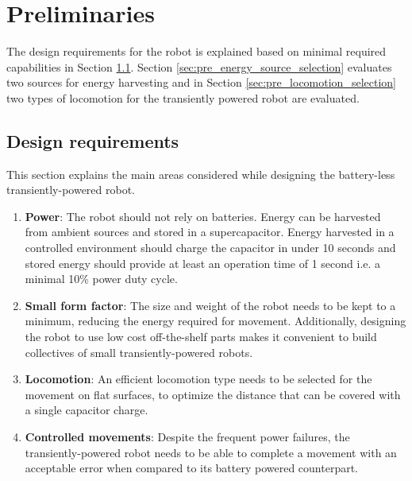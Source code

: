 \chapter{Preliminaries}
\label{chp:preliminaries}

The design requirements for the robot is explained based on minimal required capabilities in Section \ref{sec:pre_design_requirements}.
Section \ref{sec:pre_energy_source_selection} evaluates two sources for energy harvesting and in Section \ref{sec:pre_locomotion_selection} two types of locomotion for the transiently powered robot are evaluated.

\section{Design requirements}
\label{sec:pre_design_requirements}

This section explains the main areas considered while designing the battery-less transiently-powered robot.

\begin{enumerate}
	\item \textbf{Power}: 
	The robot should not rely on batteries.
	Energy can be harvested from ambient sources and stored in a supercapacitor. 
	Energy harvested in a controlled environment should charge the capacitor in under 10 seconds and stored energy should provide at least an operation time of 1 second i.e. a minimal 10\% power duty cycle.
	
	\item \textbf{Small form factor}: 
	The size and weight of the robot needs to be kept to a minimum, reducing the energy required for movement.
	Additionally, designing the robot to use low cost off-the-shelf parts makes it convenient to build collectives of small transiently-powered robots.
	
	\item \textbf{Locomotion}:
	An efficient locomotion type needs to be selected for the movement on flat surfaces, to optimize the distance that can be covered with a single capacitor charge.

	\item \textbf{Controlled movements}:
	Despite the frequent power failures, the transiently-powered robot needs to be able to complete a movement with an acceptable error when compared to its battery powered counterpart.
\end{enumerate}

